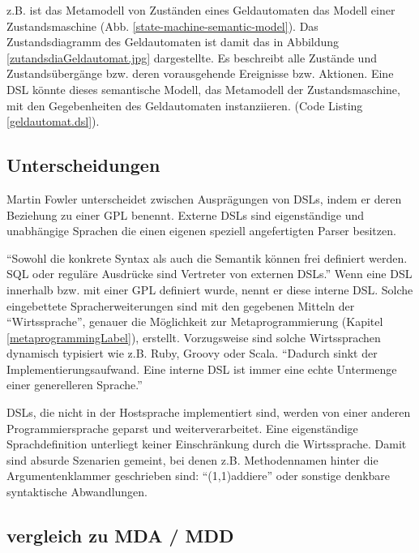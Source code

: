 \documentclass[11pt,english,ngerman, headsepline]{scrreprt}
\begin{document}
z.B. ist das Metamodell von Zuständen eines Geldautomaten das Modell einer
Zustandsmaschine (Abb. \ref{state-machine-semantic-model}). Das Zustandsdiagramm
des Geldautomaten ist damit das in Abbildung \ref{zutandsdiaGeldautomat.jpg}
dargestellte. Es beschreibt alle Zustände und Zustandsübergänge bzw. deren
vorausgehende Ereignisse bzw. Aktionen. Eine DSL könnte dieses semantische
Modell, das Metamodell der Zustandsmaschine, mit den Gegebenheiten des
Geldautomaten instanziieren. (Code Listing \ref{geldautomat.dsl}).
   

 


\subsection{Unterscheidungen}

Martin Fowler unterscheidet zwischen Ausprägungen von DSLs, indem er deren
Beziehung zu einer GPL benennt. Externe DSLs sind eigenständige und unabhängige
Sprachen die einen eigenen speziell angefertigten Parser besitzen. 

``Sowohl die konkrete Syntax als auch die Semantik können frei definiert
werden. SQL oder reguläre Ausdrücke sind Vertreter von externen DSLs.''
\cite{wikidsl} Wenn eine DSL innerhalb bzw.
mit einer GPL definiert wurde, nennt er diese interne DSL. Solche eingebettete
Spracherweiterungen sind mit den gegebenen Mitteln der ``Wirtssprache'',
genauer die Möglichkeit zur Metaprogrammierung (Kapitel
\ref{metaprogrammingLabel}), erstellt.
Vorzugsweise sind solche Wirtssprachen dynamisch typisiert wie z.B. Ruby, Groovy
oder Scala. 
``Dadurch sinkt der Implementierungsaufwand. Eine interne DSL ist immer eine echte
Untermenge einer generelleren Sprache.'' \cite{wikidsl}

DSLs, die nicht in der Hostsprache implementiert sind, werden von einer anderen
Programmiersprache geparst und weiterverarbeitet. Eine eigenständige
Sprachdefinition unterliegt keiner Einschränkung durch die Wirtssprache.
Damit sind absurde Szenarien gemeint, bei denen z.B. Methodennamen hinter die
Argumentenklammer geschrieben sind: ``(1,1)addiere'' oder sonstige denkbare
syntaktische Abwandlungen.


\subsection{vergleich zu MDA / MDD } 
\end{document}
